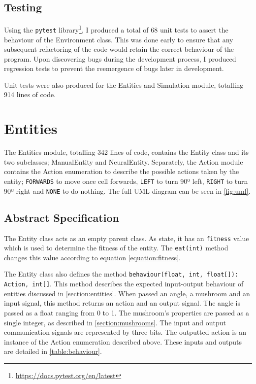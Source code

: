 \documentclass[12pt,a4paper]{report}
\begin{document}
\subsection{Testing}

Using the \texttt{pytest} library\footnote{\url{https://docs.pytest.org/en/latest}}, I produced a total of 68 unit tests to assert the behaviour of the Environment class. This was done early to ensure that any subsequent refactoring of the code would retain the correct behaviour of the program. Upon discovering bugs during the development process, I produced regression tests to prevent the reemergence of bugs later in development. 

Unit tests were also produced for the Entities and Simulation module, totalling 914 lines of code.

\section{Entities}

The Entities module, totalling 342 lines of code, contains the Entity class and its two subclasses; ManualEntity and NeuralEntity. Separately, the Action module contains the Action enumeration to describe the possible actions taken by the entity; \texttt{FORWARDS} to move once cell forwards, \texttt{LEFT} to turn 90º left, \texttt{RIGHT} to turn 90º right and \texttt{NONE} to do nothing. The full UML diagram can be seen in \cref{fig:uml}.

\subsection{Abstract Specification}

The Entity class acts as an empty parent class. As state, it has an \texttt{fitness} value which is used to determine the fitness of the entity. The \texttt{eat(int)} method changes this value according to equation \ref{equation:fitness}. 

The Entity class also defines the method \texttt{behaviour(float, int, float[]): Action, int[]}. This method describes the expected input-output behaviour of entities discussed in \cref{section:entities}. When passed an angle, a mushroom and an input signal, this method returns an action and an output signal. The angle is passed as a float ranging from 0 to 1. The mushroom's properties are passed as a single integer, as described in \cref{section:mushrooms}. The input and output communication signals are represented by three bits. The outputted action is an instance of the Action enumeration described above. These inputs and outputs are detailed in \cref{table:behaviour}. 
\end{document}
